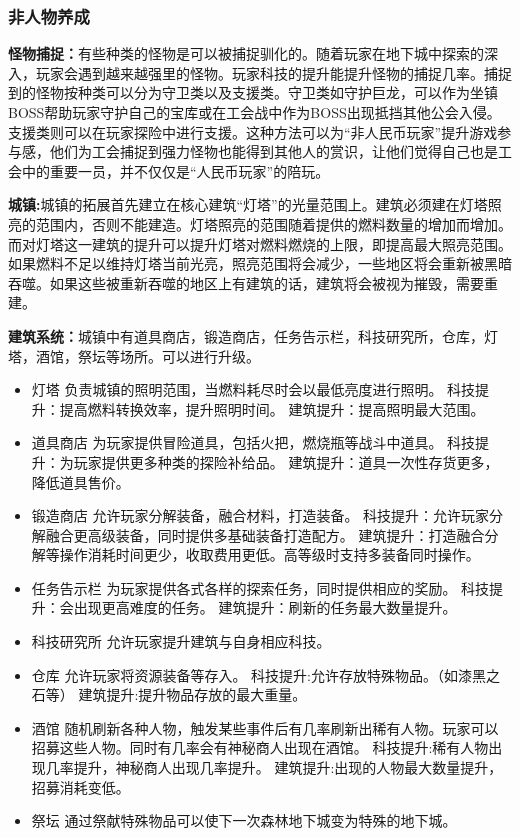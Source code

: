 \documentclass[UTF8,AutoFakeBold=1,AutoFakeSlant,zihao=-4]{cucthesis}
\begin{document}
\subsubsection{非人物养成}


\textbf{怪物捕捉：}有些种类的怪物是可以被捕捉驯化的。随着玩家在地下城中探索的深入，玩家会遇到越来越强里的怪物。玩家科技的提升能提升怪物的捕捉几率。捕捉到的怪物按种类可以分为守卫类以及支援类。守卫类如守护巨龙，可以作为坐镇BOSS帮助玩家守护自己的宝库或在工会战中作为BOSS出现抵挡其他公会入侵。支援类则可以在玩家探险中进行支援。这种方法可以为“非人民币玩家”提升游戏参与感，他们为工会捕捉到强力怪物也能得到其他人的赏识，让他们觉得自己也是工会中的重要一员，并不仅仅是“人民币玩家”的陪玩。

\textbf{城镇:}城镇的拓展首先建立在核心建筑“灯塔”的光量范围上。建筑必须建在灯塔照亮的范围内，否则不能建造。灯塔照亮的范围随着提供的燃料数量的增加而增加。而对灯塔这一建筑的提升可以提升灯塔对燃料燃烧的上限，即提高最大照亮范围。如果燃料不足以维持灯塔当前光亮，照亮范围将会减少，一些地区将会重新被黑暗吞噬。如果这些被重新吞噬的地区上有建筑的话，建筑将会被视为摧毁，需要重建。

\textbf{建筑系统：}城镇中有道具商店，锻造商店，任务告示栏，科技研究所，仓库，灯塔，酒馆，祭坛等场所。可以进行升级。


\begin{itemize}
    \item 灯塔
    负责城镇的照明范围，当燃料耗尽时会以最低亮度进行照明。
    科技提升：提高燃料转换效率，提升照明时间。
    建筑提升：提高照明最大范围。
    \item 道具商店
    为玩家提供冒险道具，包括火把，燃烧瓶等战斗中道具。
    科技提升：为玩家提供更多种类的探险补给品。
    建筑提升：道具一次性存货更多，降低道具售价。
    \item 锻造商店
    允许玩家分解装备，融合材料，打造装备。
    科技提升：允许玩家分解融合更高级装备，同时提供多基础装备打造配方。
    建筑提升：打造融合分解等操作消耗时间更少，收取费用更低。高等级时支持多装备同时操作。
    \item 任务告示栏
    为玩家提供各式各样的探索任务，同时提供相应的奖励。
    科技提升：会出现更高难度的任务。
    建筑提升：刷新的任务最大数量提升。
    \item 科技研究所
    允许玩家提升建筑与自身相应科技。
    \item 仓库
    允许玩家将资源装备等存入。
    科技提升:允许存放特殊物品。（如漆黑之石等）
    建筑提升:提升物品存放的最大重量。
    \item 酒馆
    随机刷新各种人物，触发某些事件后有几率刷新出稀有人物。玩家可以招募这些人物。同时有几率会有神秘商人出现在酒馆。
    科技提升:稀有人物出现几率提升，神秘商人出现几率提升。
    建筑提升:出现的人物最大数量提升，招募消耗变低。
    \item 祭坛
    通过祭献特殊物品可以使下一次森林地下城变为特殊的地下城。
\end{itemize}
\end{document}

